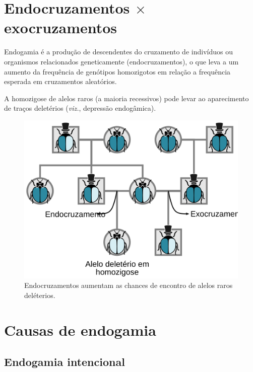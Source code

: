 \documentclass[
]{book}
\begin{document}
\hypertarget{endocruzamentos-times-exocruzamentos}{%
\section{\texorpdfstring{Endocruzamentos \(\times\) exocruzamentos}{Endocruzamentos \textbackslash times exocruzamentos}}\label{endocruzamentos-times-exocruzamentos}}

Endogamia é a produção de descendentes do cruzamento de indivíduos ou organismos relacionados geneticamente (endocruzamentos), o que leva a um aumento da frequência de genótipos homozigotos em relação a frequência esperada em cruzamentos aleatórios.

A homozigose de alelos raros (a maioria recessivos) pode levar ao aparecimento de traços deletérios (\emph{viz.}, depressão endogâmica).

\begin{figure}

{\centering \includegraphics[width=600px]{figs/inbreeding_genealogy} 

}

\caption{Endocruzamentos aumentam as chances de encontro de alelos raros deléterios.}\label{fig:inbreedinggenealogy}
\end{figure}

\hypertarget{causas-de-endogamia}{%
\section{Causas de endogamia}\label{causas-de-endogamia}}

\hypertarget{endogamia-intencional}{%
\subsection{Endogamia intencional}\label{endogamia-intencional}}
\end{document}
